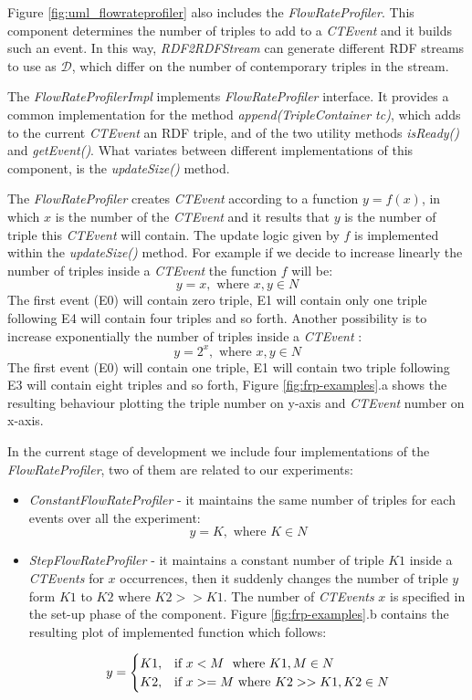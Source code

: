 Figure \ref{fig:uml_flowrateprofiler} also includes the \textit{FlowRateProfiler}. This component determines the number of triples to add to a \textit{CTEvent} and it builds such an event. In this way, \textit{RDF2RDFStream} can generate different RDF streams to use as $\mathcal{D}$, which differ on the number of contemporary triples in the stream. 



The \textit{FlowRateProfilerImpl} implements \textit{FlowRateProfiler} interface. It provides a common implementation for the method \textit{append(TripleContainer tc)}, which adds to the current \textit{CTEvent} an RDF triple,  and of the two utility methods \textit{isReady()} and \textit{getEvent()}. What variates between different implementations of this component, is the \textit{updateSize()} method. 

The \textit{FlowRateProfiler} creates \textit{CTEvent} according to a function $y=f(x)$, in which $x$ is the number of the \textit{CTEvent} and it results that $y$ is the number of triple this \textit{CTEvent} will contain. The update logic given by $f$ is implemented within the \textit{updateSize()} method. For example if we decide to increase linearly the number of triples inside a \textit{CTEvent} the function $f$ will be: \[y=x, \text{ where } x,y \in N\]
The first event (E0) will contain zero triple, E1 will contain only one triple following E4 will contain four triples and so forth. Another possibility is to increase exponentially the number of triples inside a \textit{CTEvent} : \[y=2^x, \text{ where } x,y \in N\]The first event (E0) will contain one triple, E1 will contain two triple following E3 will contain eight triples and so forth, Figure \ref{fig:frp-examples}.a shows the resulting behaviour plotting the triple number on y-axis and \textit{CTEvent} number on x-axis.



In the current stage of development we include four implementations of the \textit{FlowRateProfiler}, two of them are related to our experiments: 
\begin{itemize}
\item \textit{ConstantFlowRateProfiler} - it maintains the same number of triples for each events over all the experiment: \\
\[y=K, \text{ where } K \in N \]

\item \textit{StepFlowRateProfiler} - it maintains a constant number of triple $K1$ inside a \textit{CTEvents} for $x$ occurrences, then it suddenly changes the number of triple $y$ form $K1$ to $K2$ where $K2 >> K1$. The number of  \textit{CTEvents} $x$ is specified in the set-up phase of the component.  Figure \ref{fig:frp-examples}.b contains the resulting plot of implemented function which follows:

\[
y=
\begin{cases}
K1, &\text{if $x < M$ } $ where $ K1, M \in N\\
K2, &\text{if $x >= M$} $ where $ K2 >> K1, K2 \in N
\end{cases}
\]


\end{itemize}

